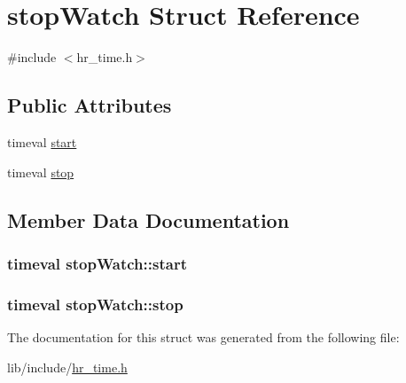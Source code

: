 \hypertarget{structstopWatch}{\section{stop\+Watch Struct Reference}
\label{structstopWatch}
}


{\ttfamily \#include $<$hr\+\_\+time.\+h$>$}

\subsection*{Public Attributes}
\begin{DoxyCompactItemize}
\item 
timeval \hyperlink{structstopWatch_aec7dc4d315b26843c8d5455afb531441}{start}
\item 
timeval \hyperlink{structstopWatch_ab6353f18737a93dda37f42faee1a808c}{stop}
\end{DoxyCompactItemize}


\subsection{Member Data Documentation}
\hypertarget{structstopWatch_aec7dc4d315b26843c8d5455afb531441}{
\subsubsection[{start}]{\setlength{\rightskip}{0pt plus 5cm}timeval stop\+Watch\+::start}}\label{structstopWatch_aec7dc4d315b26843c8d5455afb531441}
\hypertarget{structstopWatch_ab6353f18737a93dda37f42faee1a808c}{
\subsubsection[{stop}]{\setlength{\rightskip}{0pt plus 5cm}timeval stop\+Watch\+::stop}}\label{structstopWatch_ab6353f18737a93dda37f42faee1a808c}


The documentation for this struct was generated from the following file\+:\begin{DoxyCompactItemize}
\item 
lib/include/\hyperlink{hr__time_8h}{hr\+\_\+time.\+h}\end{DoxyCompactItemize}
